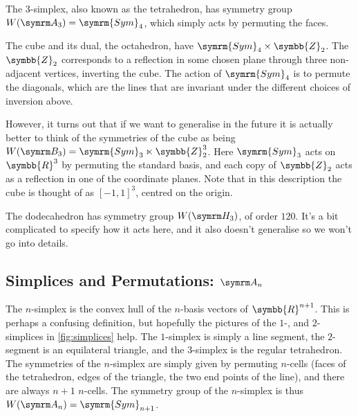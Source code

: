 \documentclass[fleqn, a4paper, openany]{memoir}
\newcommand{\reals}{\symbb{R}}
\newcommand{\Sym}{\symrm{Sym}}
\newcommand{\integers}{\symbb{Z}}
\begin{document}
    The 3-simplex, also known as the tetrahedron, has symmetry group \(W(\A[3]) = \Sym_4\), which simply acts by permuting the faces.
    
    The cube and its dual, the octahedron, have \(\Sym_4 \times \integers_2\).
    The \(\integers_2\) corresponds to a reflection in some chosen plane through three non-adjacent vertices, inverting the cube.
    The action of \(\Sym_4\) is to permute the diagonals, which are the lines that are invariant under the different choices of inversion above.
    
    However, it turns out that if we want to generalise in the future it is actually better to think of the symmetries of the cube as being \(W(\B[3]) = \Sym_3 \ltimes \integers_2^3\).
    Here \(\Sym_3\) acts on \(\reals^3\) by permuting the standard basis, and each copy of \(\integers_2\) acts as a reflection in one of the coordinate planes.
    Note that in this description the cube is thought of as \([-1, 1]^3\), centred on the origin.
    
    The dodecahedron has symmetry group \(W(\H[3])\), of order \(120\).
    It's a bit complicated to specify how it acts here, and it also doesn't generalise so we won't go into details.
    
    \subsection{Simplices and Permutations: \texorpdfstring{\(\A[n]\)}{An}}
    The \(n\)-simplex is the convex hull of the \(n\)-basis vectors of \(\reals^{n+1}\).
    This is perhaps a confusing definition, but hopefully the pictures of the \(1\)-, and \(2\)-simplices in \cref{fig:simplices} help.
    The \(1\)-simplex is simply a line segment, the \(2\)-segment is an equilateral triangle, and the \(3\)-simplex is the regular tetrahedron.
    The symmetries of the \(n\)-simplex are simply given by permuting \(n\)-cells (faces of the tetrahedron, edges of the triangle, the two end points of the line), and there are always \(n + 1\) \(n\)-cells.
    The symmetry group of the \(n\)-simplex is thus \(W(\A[n]) = \Sym_{n+1}\).
    
\end{document}
